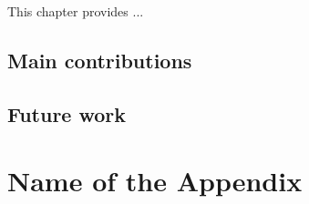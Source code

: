 \documentclass[12pt,english]{book}
\begin{document}
This chapter provides ...

\section{Main contributions}

\section{Future work}

\appendix

\chapter{Name of the Appendix}

\cleardoublepage



\cleardoublepage{}


\end{document}
